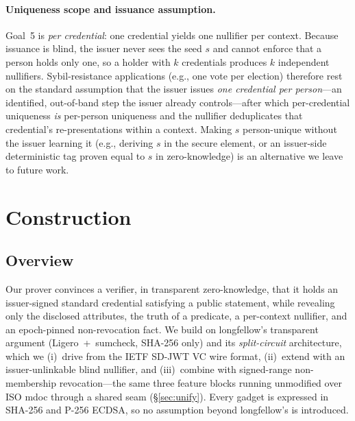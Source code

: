 \documentclass[11pt]{article}
\theoremstyle{plain}
\theoremstyle{definition}
\begin{document}
\paragraph{Uniqueness scope and issuance assumption.}
Goal~5 is \emph{per credential}: one credential yields one nullifier per context.
Because issuance is blind, the issuer never sees the seed $s$ and cannot enforce that a
person holds only one, so a holder with $k$ credentials produces $k$ independent
nullifiers. Sybil-resistance applications (e.g., one vote per election) therefore rest
on the standard assumption that the issuer issues \emph{one credential per
person}---an identified, out-of-band step the issuer already controls---after which
per-credential uniqueness \emph{is} per-person uniqueness and the nullifier
deduplicates that credential's re-presentations within a context. Making $s$
person-unique without the issuer learning it (e.g., deriving $s$ in the secure element,
or an issuer-side deterministic tag proven equal to $s$ in zero-knowledge) is an
alternative we leave to future work.

\section{Construction}\label{sec:construction}

\subsection{Overview}
Our prover convinces a verifier, in transparent zero-knowledge, that it holds an
issuer-signed standard credential satisfying a public statement, while revealing only
the disclosed attributes, the truth of a predicate, a per-context nullifier, and an
epoch-pinned non-revocation fact. We build on longfellow's transparent argument
(Ligero~+~sumcheck, SHA-256 only) and its \emph{split-circuit} architecture, which we
(i)~drive from the IETF SD-JWT VC wire format, (ii)~extend with an issuer-unlinkable
blind nullifier, and (iii)~combine with signed-range non-membership revocation---the
same three feature blocks running unmodified over ISO mdoc through a shared seam
(\S\ref{sec:unify}). Every gadget is expressed in SHA-256 and P-256 ECDSA, so no
assumption beyond longfellow's is introduced.
\end{document}
